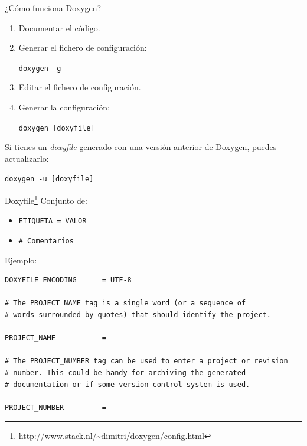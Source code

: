 \documentclass[12pt,xcolor=svgnames]{beamer}
\begin{document}
\begin{frame}{¿Cómo funciona Doxygen?}
  \begin{enumerate}
  \item Documentar el código.
  \item Generar el fichero de configuración: 
    \begin{center}\texttt{doxygen -g}\end{center}
  \item Editar el fichero de configuración.
  \item Generar la configuración:
    \begin{center}\texttt{doxygen [doxyfile]}\end{center}
  \end{enumerate}

  \begin{block}{}
    Si tienes un \textit{doxyfile} generado con una versión anterior de
    Doxygen, puedes actualizarlo:
    \begin{center}\texttt{doxygen -u [doxyfile]}\end{center}
  \end{block}
\end{frame}

\begin{frame}[fragile]{Doxyfile\footnote{{\scriptsize \url{http://www.stack.nl/~dimitri/doxygen/config.html}}}}
  Conjunto de:
  \begin{itemize}
  \item  \texttt{ETIQUETA = VALOR}
  \item \texttt{\# Comentarios}
  \end{itemize}
  \vspace*{0.5cm}
  Ejemplo:
{\scriptsize
\begin{verbatim}
DOXYFILE_ENCODING      = UTF-8

# The PROJECT_NAME tag is a single word (or a sequence of
# words surrounded by quotes) that should identify the project.

PROJECT_NAME           =                                      

# The PROJECT_NUMBER tag can be used to enter a project or revision
# number. This could be handy for archiving the generated
# documentation or if some version control system is used.                     

PROJECT_NUMBER         =  
\end{verbatim}
}
\end{frame}
\end{document}

